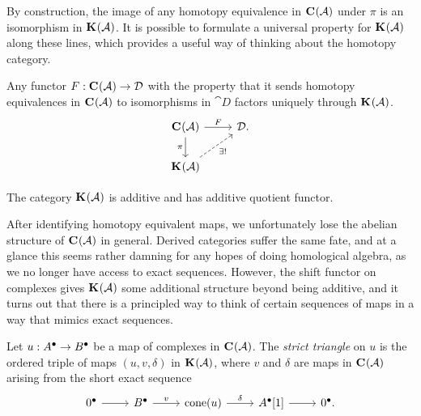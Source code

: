 By construction, the image of any homotopy equivalence in
${\mathbf{C}}^{{}}({\mathcal{A}})$ under $\pi$ is an isomorphism in ${\mathbf{K}}^{{}}({\mathcal{A}})$.
It is possible to formulate a universal property for
${\mathbf{K}}^{{}}({\mathcal{A}})$ along these lines, which provides a useful way
of thinking about the homotopy category.

\begin{proposition}
  \label{prop_univ_prop_of_homcat}
  Any functor $F: {\mathbf{C}}^{{}}({\mathcal{A}}) \to \mathcal{D}$ with the property that
  it sends homotopy equivalences in ${\mathbf{C}}^{{}}({\mathcal{A}})$ to isomorphisms
  in $\cat{D}$ factors uniquely through ${\mathbf{K}}^{{}}({\mathcal{A}})$.
  \[
    \begin{tikzcd}
      \Ch{\abcat{A}} & {\cat{D}.} \\
      \homcat{\abcat{A}}
      \arrow["F", from=1-1, to=1-2]
      \arrow["\pi"', from=1-1, to=2-1]
      \arrow["\exists!"', dashed, from=2-1, to=1-2]
    \end{tikzcd}
  \]
\end{proposition}

\begin{proposition}
  The category ${\mathbf{K}}^{{}}({\mathcal{A}})$ is additive and has additive
  quotient functor.
\end{proposition}

After identifying homotopy equivalent maps, we unfortunately lose the
abelian structure of ${\mathbf{C}}^{{}}({\mathcal{A}})$ in general.
Derived categories suffer the same fate, and at a glance this seems
rather damning for any hopes of doing homological algebra, as we no
longer have access to exact sequences.
However, the shift functor on complexes gives ${\mathbf{K}}^{{}}({\mathcal{A}})$
some additional structure beyond being additive, and it turns out
that there is a principled way to think of certain sequences of maps
in a way that mimics exact sequences.

\begin{definition}
  Let $u: {{A}}^{\bullet} \to {{B}}^{\bullet}$ be a map of complexes
  in ${\mathbf{C}}^{{}}({\mathcal{A}})$.
  The \emph{strict triangle} on $u$ is the ordered triple of maps
  $(u, v, \delta)$ in ${\mathbf{K}}^{{}}({\mathcal{A}})$, where $v$ and $\delta$
  are maps in ${\mathbf{C}}^{{}}({\mathcal{A}})$ arising from the short exact sequence
  \[
    \begin{tikzcd}
      \cochaincomp{0} \arrow[r]
      & \cochaincomp{B} \arrow[r, "v"]
      & \cone{u} \arrow[r, "\delta"]
      & \cochaincomp{A}[1] \arrow[r]
      & \cochaincomp{0}.
    \end{tikzcd}
  \]
  \vspace{-24pt}
\end{definition}

